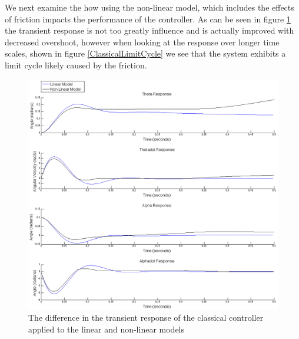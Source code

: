 \documentclass{article}
\theoremstyle{plain}
\theoremstyle{definition}
\theoremstyle{remark}
\begin{document}
We next examine the how using the non-linear model, which includes the effects of friction impacts the performance of the controller.  As can be seen in figure \ref{q8classicaltransientCompare} the transient response is not too greatly influence and is actually improved with decreased overshoot, however when looking at the response over longer time scales, shown in figure \ref{ClassicalLimitCycle} we see that the system exhibits a limit cycle likely caused by the friction.  

\begin{figure}
\begin{center}
\includegraphics[width = 15cm]{classicaltransientLinearvsNonLinear.png}
\end{center}
\caption{The difference in the transient response of the classical controller applied to the linear and non-linear models}
\label{q8classicaltransientCompare}
\end{figure}
\end{document}
